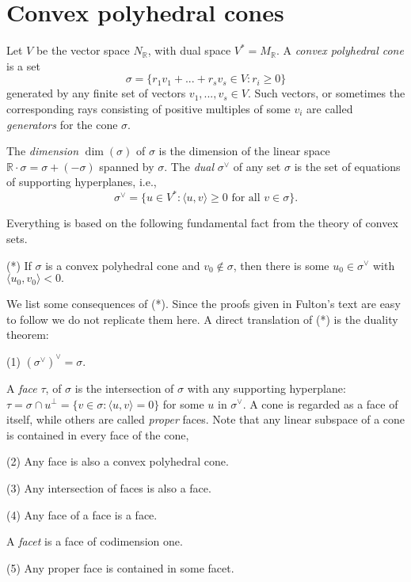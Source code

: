 \documentclass[10pt,a4paper]{book}
\newcommand{\on}{\operatorname}
\begin{document}
\section{Convex polyhedral cones}
Let $V$ be the vector space $N_\mathbb{R}$, with dual space $V^* = M_\mathbb{R}$. A \textit{convex polyhedral cone} is a set 
\[
\sigma = \{r_1v_1+...+r_sv_s\in V: r_i\geq 0\}
\]
generated by any finite set of vectors $v_1,..., v_s \in V$. Such vectors, or sometimes the corresponding rays consisting of positive multiples of some $v_i$ are called \textit{generators} for the cone $\sigma$.


The \textit{dimension} $\on{dim}(\sigma)$ of $\sigma$ is the dimension of the linear space $\mathbb{R}\cdot \sigma = \sigma  + (-\sigma)$ spanned by $\sigma$. The \textit{dual} $\sigma^\vee$ of any set $\sigma$ is the set of equations of supporting hyperplanes, i.e.,
\[
\sigma^\vee = \{u\in V^*: \langle u,v \rangle \geq 0 \text{ for all }v\in \sigma\}.
\]

Everything is based on the following fundamental fact from the theory of convex sets.

\smallskip
\noindent (*) If  $\sigma$ is a convex polyhedral cone and  $v_0\notin \sigma$, then there is some  $u_0 \in \sigma^\vee$ with $\langle u_0, v_0 \rangle < 0.$
\smallskip

We list some consequences of (*). Since the proofs given in Fulton's text are easy to follow we do not replicate them here.
A direct translation of (*) is the duality theorem:

\smallskip
\noindent (1) $(\sigma^\vee)^\vee = \sigma.$
\smallskip

A \textit{face} $\tau$, of $\sigma$ is the intersection of $\sigma$ with any supporting hyperplane: $\tau= \sigma\cap u^\perp =\{v\in \sigma :\langle u, v \rangle = 0\}$ for some $u$ in $\sigma^\vee$. A cone is regarded as a face of itself, while others are called \textit{proper} faces. Note that any linear subspace of a cone is contained in every face of the cone,

\smallskip
\noindent (2) Any face is also a convex polyhedral cone. 
\smallskip

\smallskip
\noindent (3) Any intersection of faces is also a face.
\smallskip

\smallskip
\noindent (4) Any face of a face is a face.
\smallskip

A \textit{facet} is a face of codimension one.

\smallskip
\noindent (5) Any proper face is contained in some facet.
\smallskip
\end{document}
